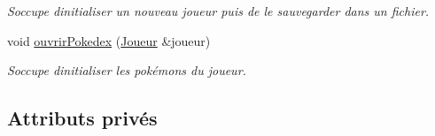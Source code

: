 \begin{DoxyCompactItemize}
\begin{DoxyCompactList}\small\item\em S\textquotesingle{}occupe d\textquotesingle{}initialiser un nouveau joueur puis de le sauvegarder dans un fichier. \end{DoxyCompactList}\item 
void \hyperlink{class_s_f_m_l_charger_a67c610529df46560908104f963d741f1}{ouvrir\+Pokedex} (\hyperlink{class_joueur}{Joueur} \&joueur)
\begin{DoxyCompactList}\small\item\em S\textquotesingle{}occupe d\textquotesingle{}initialiser les pokémons du joueur. \end{DoxyCompactList}\end{DoxyCompactItemize}
\subsection*{Attributs privés}
